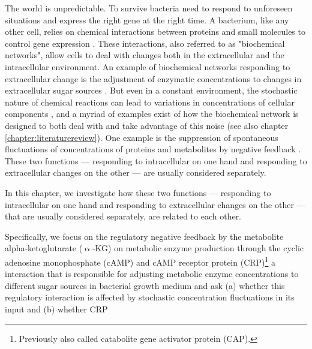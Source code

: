 The world is unpredictable. To survive bacteria need to respond to unforeseen situations and express the right gene at the right time. 
A bacterium, like any other cell, relies on chemical interactions between proteins and small molecules to control gene expression \cite{Bray1995, Alon2006, Alon2007, Tyson2010}.
These interactions, also referred to as "biochemical networks", 
%
allow cells to deal with changes %
both in the extracellular and the intracellular environment.
%
An example of biochemical networks responding to extracellular change is the adjustment of enzymatic concentrations to changes in extracellular sugar sources \cite{Towbin2017}.
But even in a constant environment, the stochastic nature of chemical reactions can lead to variations in concentrations of cellular components  \cite{Elowitz2002,Kiviet2014}, 
and a myriad of examples exist of how the biochemical network is designed to both deal with and take advantage of this noise (see also chapter \ref{chapter:literaturereview}).
One example is the suppression of spontaneous fluctuations of concentrations of proteins and metabolites by negative feedback \cite{Brandman2008, Lestas2010, Bowsher2013}.
%
These two functions --- responding to intracellular on one hand and responding to extracellular changes on the other --- are usually considered separately.

In this chapter, we investigate how these two functions --- responding to intracellular on one hand and responding to extracellular changes on the other --- that are usually considered separately, are related to each other.


Specifically, we focus on the regulatory negative feedback by the metabolite alpha-ketoglutarate ($\upalpha$-KG) on metabolic enzyme production through the cyclic adenosine monophosphate (cAMP) and cAMP receptor protein (CRP)\footnote{Previously also called catabolite gene activator protein (CAP).} a interaction that is responsible for adjusting metabolic enzyme concentrations to different sugar sources in bacterial growth medium \cite{Towbin2017, Doucette2011, You2013} and ask (a) whether this regulatory interaction is affected by stochastic concentration fluctuations in its input and (b) whether CRP 
%


